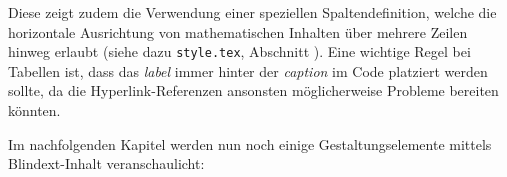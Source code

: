 %
Diese zeigt zudem die Verwendung einer speziellen Spaltendefinition, welche die horizontale Ausrichtung von mathematischen Inhalten über mehrere Zeilen hinweg erlaubt (siehe dazu \texttt{style.tex}, Abschnitt ). Eine wichtige Regel bei Tabellen ist, dass das \emph{label} immer hinter der \emph{caption} im Code platziert werden sollte, da die Hyperlink-Referenzen ansonsten möglicherweise Probleme bereiten könnten.
%
\\\par\noindent Im nachfolgenden Kapitel werden nun noch einige Gestaltungselemente mittels Blindext-Inhalt veranschaulicht: \blindtext
%
%
\ifx\fulldocument\undefined
  \printnomenclature
  \printbibliography
  
\fi
%